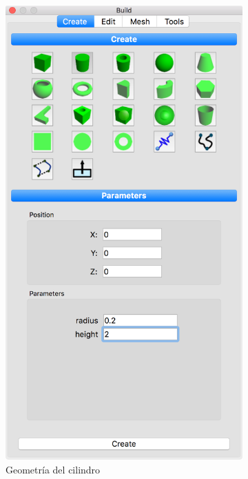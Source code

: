 \begin{figure}[!htp]
\begin{subfigure}[b]{0.30\textwidth}
\includegraphics[width=\linewidth]{figuras_4/01_pre_create.png}
\caption{Geometría del cilindro}
\label{fig:pre-01-1}
\end{subfigure}
\begin{subfigure}[b]{0.30\textwidth}

\end{subfigure}
\end{figure}
